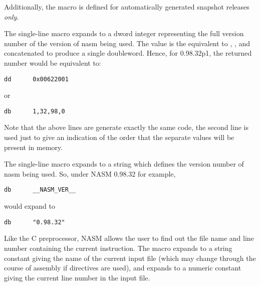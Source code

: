 Additionally, the macro  is defined for
automatically generated snapshot releases \emph{only}.


The single-line macro  expands to a dword integer
representing the full version number of the version of nasm being used.
The value is the equivalent to , ,
 and  concatenated to
produce a single doubleword. Hence, for 0.98.32p1, the returned number
would be equivalent to:

\begin{lstlisting}
dd      0x00622001
\end{lstlisting}

or

\begin{lstlisting}
db      1,32,98,0
\end{lstlisting}

Note that the above lines are generate exactly the same code, the second
line is used just to give an indication of the order that the separate
values will be present in memory.



The single-line macro  expands to a string which defines
the version number of nasm being used. So, under NASM 0.98.32 for example,

\begin{lstlisting}
db      __NASM_VER__
\end{lstlisting}

would expand to

\begin{lstlisting}
db      "0.98.32"
\end{lstlisting}


Like the C preprocessor, NASM allows the user to find out the file
name and line number containing the current instruction. The macro
 expands to a string constant giving the name of the
current input file (which may change through the course of assembly
if  directives are used), and  expands
to a numeric constant giving the current line number in the input file.

